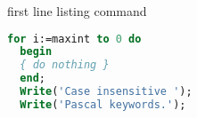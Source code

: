 \documentclass{article}
\begin{document}
  \begin{listing}[step]{first line}
    listing command
  \end{listing}

  \begin{lstlisting}[language=Pascal]
  for i:=maxint to 0 do
  begin
  { do nothing }
  end;
  Write('Case insensitive ');
  Write('Pascal keywords.');
  \end{lstlisting}
\end{document}
